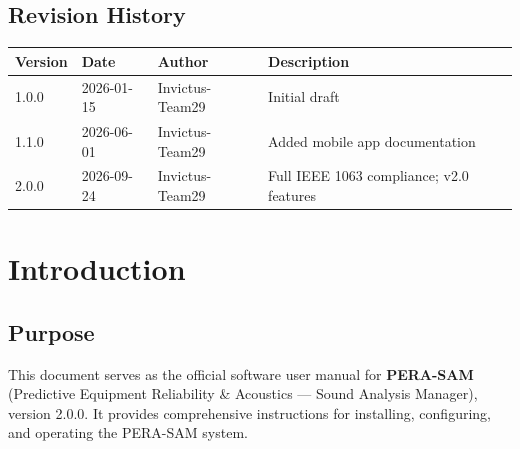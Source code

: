 \documentclass[10pt, a4paper, oneside]{report}
\begin{document}
\clearpage
\thispagestyle{fancy}
\section*{Revision History}

\begin{table}[H]
\centering
\begin{tabularx}{\textwidth}{l l l X}
  \toprule
  \textbf{Version} & \textbf{Date} & \textbf{Author} & \textbf{Description} \\
  \midrule
  1.0.0 & 2026-01-15 & Invictus-Team29 & Initial draft \\
  1.1.0 & 2026-06-01 & Invictus-Team29 & Added mobile app documentation \\
  2.0.0 & 2026-09-24 & Invictus-Team29 & Full IEEE 1063 compliance; v2.0 features \\
  \bottomrule
\end{tabularx}
\end{table}

\vspace{0.6em}
\begingroup
\let\clearpage\relax
\let\cleardoublepage\relax
\tableofcontents
\vspace{0.8em}
\listoffigures
\vspace{0.8em}
\listoftables
\endgroup
\clearpage


\chapter{Introduction}
\label{ch:introduction}

\section{Purpose}
\label{sec:purpose}

This document serves as the official software user manual for \textbf{PERA-SAM} (Predictive Equipment Reliability \& Acoustics --- Sound Analysis Manager), version 2.0.0. It provides comprehensive instructions for installing, configuring, and operating the PERA-SAM system.
\end{document}
